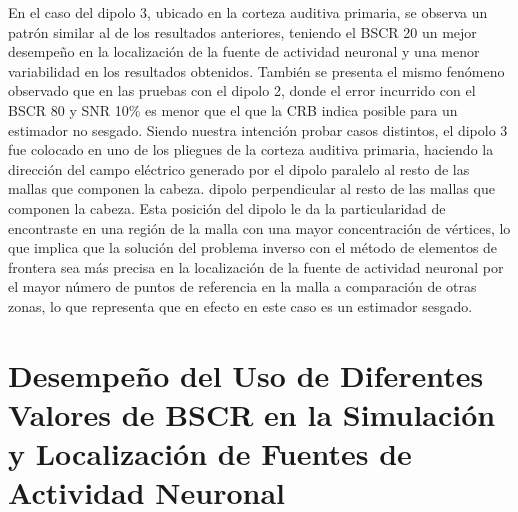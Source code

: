 En el caso del dipolo 3, ubicado en la corteza auditiva primaria, se observa un patrón similar al de los resultados anteriores, teniendo el BSCR 20 un mejor desempeño en la localización de la fuente de actividad neuronal y una menor variabilidad en los resultados obtenidos.
También se presenta el mismo fenómeno observado que en las pruebas con el dipolo 2, donde el error incurrido con el BSCR 80 y SNR 10\% es menor que el que la CRB indica posible para un estimador no sesgado.
Siendo nuestra intención probar casos distintos, el dipolo 3 fue colocado en uno de los pliegues de la corteza auditiva primaria, haciendo la dirección del campo eléctrico generado por el dipolo paralelo al resto de las mallas que componen la cabeza.
dipolo perpendicular al resto de las mallas que componen la cabeza.
Esta posición del dipolo le da la particularidad de encontraste en una región de la malla con una mayor concentración de vértices, lo que implica que la solución del problema inverso con el método de elementos de frontera sea más precisa en la localización de la fuente de actividad neuronal por el mayor número de puntos de referencia en la malla a comparación de otras zonas, lo que representa que en efecto en este caso es un estimador sesgado. 

\section{Desempeño del Uso de Diferentes Valores de BSCR en la Simulación y Localización de Fuentes de Actividad Neuronal}
\label{sec:results:bscr-performance}

